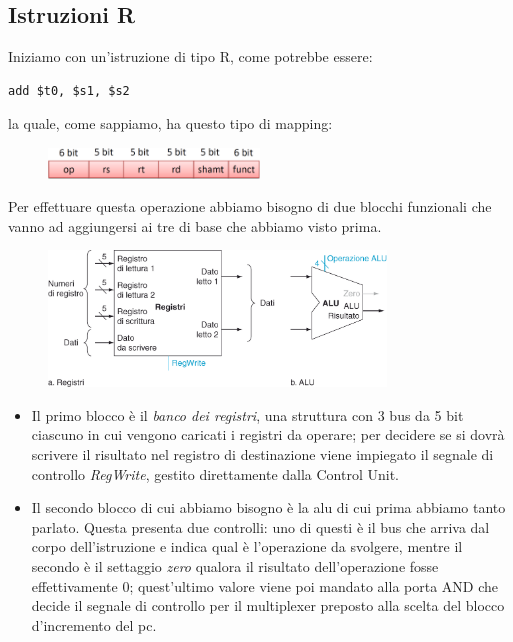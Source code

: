 \documentclass[class=book, crop=false, oneside]{standalone}
\begin{document}
\subsection{Istruzioni R}
Iniziamo con un’istruzione di tipo R, come potrebbe essere:
\begin{verbatim}
add $t0, $s1, $s2
\end{verbatim}
la quale, come sappiamo, ha questo tipo di mapping:
\begin{figure}[H]
	\centering
	\includegraphics[width=0.5\textwidth,keepaspectratio]{mappatura.png}
\end{figure}
Per effettuare questa operazione abbiamo bisogno di due blocchi funzionali che vanno ad aggiungersi ai tre di base che abbiamo visto prima.
\begin{figure}[H]
	\centering
	\includegraphics[width=0.8\textwidth,keepaspectratio]{R_ex.png}
\end{figure}
\begin{itemize}
	\item Il primo blocco è il \emph{banco dei registri}, una struttura con 3 bus da 5 bit ciascuno in cui vengono caricati i registri da operare; per decidere se si dovrà scrivere il risultato nel registro di destinazione viene impiegato il segnale di controllo \emph{RegWrite}, gestito direttamente dalla Control Unit.
	\item Il secondo blocco di cui abbiamo bisogno è la \acrshort{alu} di cui prima abbiamo tanto parlato. Questa presenta due controlli: uno di questi è il bus che arriva dal corpo dell'istruzione e indica qual è l'operazione da svolgere, mentre il secondo è il settaggio \emph{zero} qualora il risultato dell'operazione fosse effettivamente 0; quest'ultimo valore viene poi mandato alla porta AND che decide il segnale di controllo per il multiplexer preposto alla scelta del blocco d'incremento del \acrshort{pc}.
\end{itemize}
\end{document}
